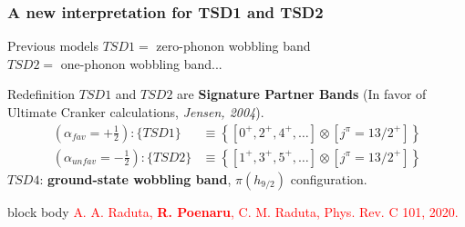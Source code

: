 \documentclass{beamer}
\begin{document}
\begin{frame}
	\frametitle{A new interpretation for TSD1 and TSD2}
	\begin{exampleblock}{Previous models}
		$TSD1=$ zero-phonon wobbling band\\
		$TSD2=$ one-phonon wobbling band...
	\end{exampleblock}
	\begin{alertblock}{Redefinition}
		$TSD1$ and $TSD2$ are \textbf{Signature Partner Bands} (In favor of Ultimate Cranker calculations, \textit{Jensen, 2004}).
		\begin{align}
			\left(\alpha_{fav}=+\frac{1}{2}\right): \{TSD1\}&\equiv\left\{\left[0^+,2^+,4^+,\dots\right] \otimes [j^\pi=13/2^+]\right\}\nonumber\\
			\left(\alpha_{unfav}=-\frac{1}{2}\right): \{TSD2\}&\equiv\left\{\left[1^+,3^+,5^+,\dots\right] \otimes [j^\pi=13/2^+]\right\}\nonumber
		\end{align}
		$TSD4$: \textbf{ground-state wobbling band}, $\pi(h_{9/2})$ configuration.
	\end{alertblock}
	\begin{beamercolorbox}[rounded=true,shadow=false, wd=\linewidth,]{block body}
		\centering
		\textcolor{red}{\footnotesize{A. A. Raduta, \textbf{R. Poenaru}, C. M. Raduta, Phys. Rev. C 101, 2020.}}
	\end{beamercolorbox}
\end{frame}
\end{document}
